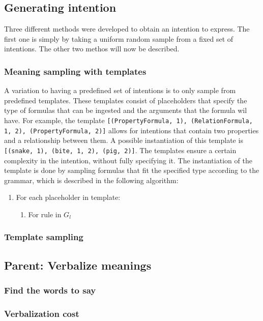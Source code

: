 \documentclass[a4paper]{article}
\begin{document}
\subsection{Generating intention}
Three different methods were developed to obtain an intention to express. The first one is simply by taking a uniform random sample from a fixed set of intentions. The other two methos will now be described.
\subsubsection{Meaning sampling with templates}
A variation to having a predefined set of intentions is to only sample from predefined templates. These templates consist of placeholders that specify the type of formulas that can be ingested and the arguments that the formula wil have. For example, the template \verb|[(PropertyFormula, 1), (RelationFormula, 1, 2), (PropertyFormula, 2)]| allows for intentions that contain two properties and a relationship between them. A possible instantiation of this template is \verb|[(snake, 1), (bite, 1, 2), (pig, 2)]|. The templates ensure a certain complexity in the intention, without fully specifying it. The instantiation of the template is done by sampling formulas that fit the specified type according to the grammar, which is described in the following algorithm:
\begin{enumerate}
    \item For each placeholder in template:
        \begin{enumerate}
            \item For rule in $G_l$
        \end{enumerate}
\end{enumerate}

\subsubsection{Template sampling}

\subsection{Parent: Verbalize meanings}
\subsubsection{Find the words to say}
\subsubsection{Verbalization cost}
\end{document}
